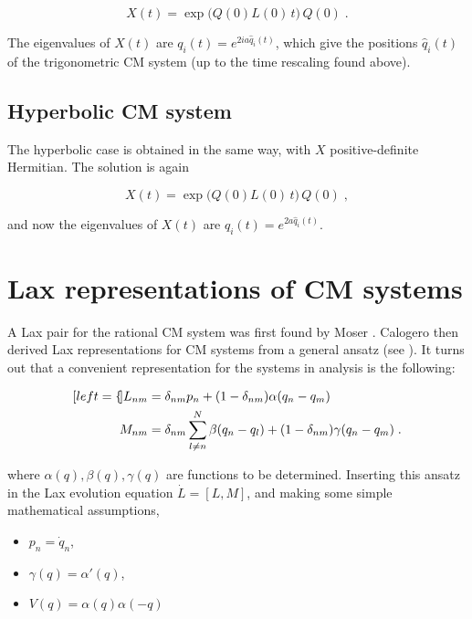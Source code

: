 \begin{equation}
    X(t) = \exp{\big(Q(0)L(0)\,t\big)}\,Q(0)\;.
\end{equation}

The eigenvalues of $X(t)$ are $q_i(t) = e^{2ia\hat q_i(t)}$, which give the positions $\hat q_i(t)$ of the trigonometric CM system (up to the time rescaling found above).

\subsection{Hyperbolic CM system}
The hyperbolic case is obtained in the same way, with $X$ positive-definite Hermitian. The solution is again

\begin{equation}
    X(t) = \exp{\big(Q(0)L(0)\,t\big)}\,Q(0)\;,
\end{equation}

and now the eigenvalues of $X(t)$ are $q_i(t) = e^{2a\hat q_i(t)}$.

\section{Lax representations of CM systems}\label{laxcouples}
A Lax pair for the rational CM system was first found by Moser \cite{moser1975}. Calogero then derived Lax representations for CM systems from a general ansatz (see \cite{calogero2003classical}). It turns out that a convenient representation for the systems in analysis is the following:

\begin{subequations}
\begin{align}[left=\empheqlbrace]
L_{nm} &= \delta_{nm} p_n + (1 - \delta_{nm}) \alpha (q_n - q_m) \\
M_{nm} &= \delta_{nm} \sum_{l \neq n}^N \beta(q_n - q_l) + (1-\delta_{nm}) \gamma (q_n - q_m)\;.
\end{align}
\end{subequations}

where $\alpha(q), \beta(q), \gamma(q)$ are functions to be determined. Inserting this ansatz in the Lax evolution equation $\dot L = [L,M]$, and making some simple mathematical assumptions,

\begin{itemize}
    \item $p_n = \dot q_n$,
    \item $\gamma (q) = \alpha'(q)$,
    \item $V(q) = \alpha (q) \alpha (-q)$
\end{itemize}

